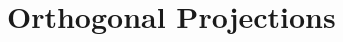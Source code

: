 \documentclass[10pt]{book}
\newcommand{\vect}[1]{\ensuremath{\boldsymbol{\mathbf{#1}}}}
\DeclareMathOperator{\proj}{proj}
\newcommand{\yhat}{\hat{\vect{y}}}
\begin{document}
\newpage


\section{Orthogonal Projections}

\end{document}
